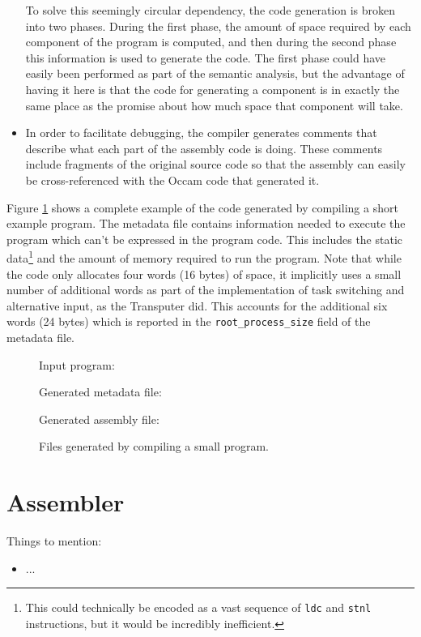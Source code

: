 \begin{itemize}
    To solve this seemingly circular dependency, the code generation is broken
    into two phases. During the first phase, the amount of space required by
    each component of the program is computed, and then during the second phase
    this information is used to generate the code. The first phase could have
    easily been performed as part of the semantic analysis, but the advantage of
    having it here is that the code for generating a component is in exactly the
    same place as the promise about how much space that component will take.
  \item
    In order to facilitate debugging, the compiler generates comments that
    describe what each part of the assembly code is doing. These comments
    include fragments of the original source code so that the assembly can
    easily be cross-referenced with the Occam code that generated it.
\end{itemize}

Figure \ref{code-example} shows a complete example of the code generated by
compiling a short example program. The metadata file contains information needed
to execute the program which can't be expressed in the program code. This
includes the static data\footnote{This could technically be encoded as a vast
sequence of \texttt{ldc} and \texttt{stnl} instructions, but it would be
incredibly inefficient.} and the amount of memory required to run the program.
Note that while the code only allocates four words (16 bytes) of space, it
implicitly uses a small number of additional words as part of the implementation
of task switching and alternative input, as the Transputer did. This accounts
for the additional six words (24 bytes) which is reported in the
\texttt{root\_process\_size} field of the metadata file.

\begin{figure}[p]
  \label{code-example}
  Input program:
  
  Generated metadata file:
  
  Generated assembly file:
  
  \caption{Files generated by compiling a small program.}
\end{figure}

\section{Assembler}

{
  \color{red}
  Things to mention:

  \begin{itemize}
    \item ...
  \end{itemize}
}


